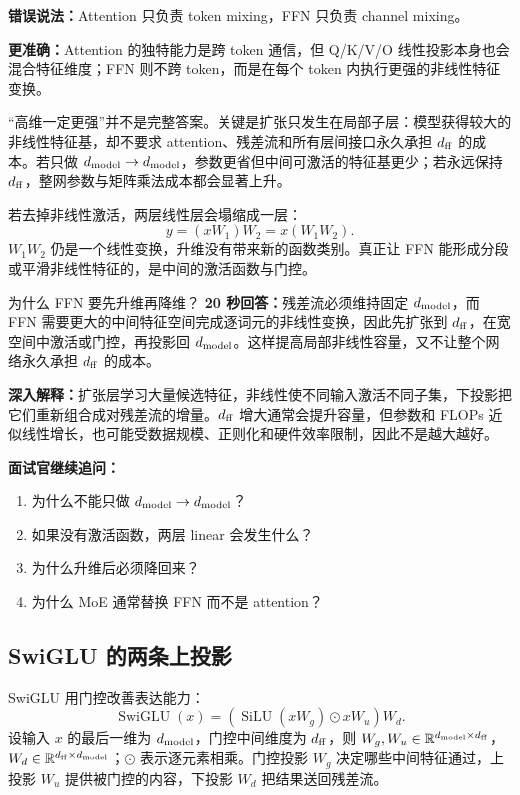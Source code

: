 \begin{wrongbox}
\textbf{错误说法：}Attention 只负责 token mixing，FFN 只负责 channel mixing。

\textbf{更准确：}Attention 的独特能力是跨 token 通信，但 Q/K/V/O 线性投影本身也会混合特征维度；FFN 则不跨 token，而是在每个 token 内执行更强的非线性特征变换。
\end{wrongbox}

“高维一定更强”并不是完整答案。关键是扩张只发生在局部子层：模型获得较大的非线性特征基，却不要求 attention、残差流和所有层间接口永久承担 $d_{\rm ff}$ 的成本。若只做 $d_{\rm model}\to d_{\rm model}$，参数更省但中间可激活的特征基更少；若永远保持 $d_{\rm ff}$，整网参数与矩阵乘法成本都会显著上升。

\figFFNExpansion

若去掉非线性激活，两层线性层会塌缩成一层：
\[
y=(xW_1)W_2=x(W_1W_2).
\]
$W_1W_2$ 仍是一个线性变换，升维没有带来新的函数类别。真正让 FFN 能形成分段或平滑非线性特征的，是中间的激活函数与门控。

\begin{interviewbox}{为什么 FFN 要先升维再降维？}
\textbf{20 秒回答：}残差流必须维持固定 $d_{\rm model}$，而 FFN 需要更大的中间特征空间完成逐词元的非线性变换，因此先扩张到 $d_{\rm ff}$，在宽空间中激活或门控，再投影回 $d_{\rm model}$。这样提高局部非线性容量，又不让整个网络永久承担 $d_{\rm ff}$ 的成本。

\textbf{深入解释：}扩张层学习大量候选特征，非线性使不同输入激活不同子集，下投影把它们重新组合成对残差流的增量。$d_{\rm ff}$ 增大通常会提升容量，但参数和 FLOPs 近似线性增长，也可能受数据规模、正则化和硬件效率限制，因此不是越大越好。

\textbf{面试官继续追问：}
\begin{enumerate}
  \item 为什么不能只做 $d_{\rm model}\to d_{\rm model}$？
  \item 如果没有激活函数，两层 linear 会发生什么？
  \item 为什么升维后必须降回来？
  \item 为什么 MoE 通常替换 FFN 而不是 attention？
\end{enumerate}
\end{interviewbox}

\subsection{SwiGLU 的两条上投影}

SwiGLU 用门控改善表达能力：
\[
\operatorname{SwiGLU}(x)=
\left(\operatorname{SiLU}(xW_g)\odot xW_u\right)W_d.
\]
设输入 $x$ 的最后一维为 $d_{\rm model}$，门控中间维度为 $d_{\rm ff}$，则 $W_g,W_u\in\mathbb R^{d_{\rm model}\times d_{\rm ff}}$，$W_d\in\mathbb R^{d_{\rm ff}\times d_{\rm model}}$；$\odot$ 表示逐元素相乘。门控投影 $W_g$ 决定哪些中间特征通过，上投影 $W_u$ 提供被门控的内容，下投影 $W_d$ 把结果送回残差流。

